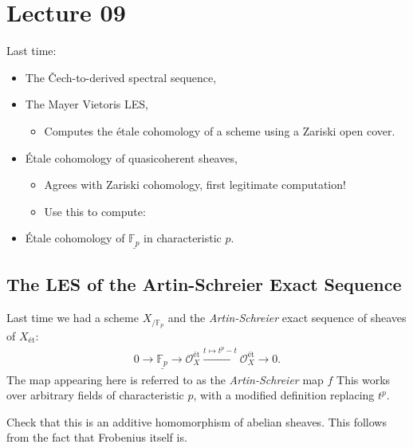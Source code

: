 \hypertarget{lecture-09}{%
\section{Lecture 09}\label{lecture-09}}

Last time:

\begin{itemize}
\tightlist
\item
  The Čech-to-derived spectral sequence,
\item
  The Mayer Vietoris LES,

  \begin{itemize}
  \tightlist
  \item
    Computes the étale cohomology of a scheme using a Zariski open
    cover.
  \end{itemize}
\item
  Étale cohomology of quasicoherent sheaves,

  \begin{itemize}
  \tightlist
  \item
    Agrees with Zariski cohomology, first legitimate computation!
  \item
    Use this to compute:
  \end{itemize}
\item
  Étale cohomology of \(\underline{{\mathbb{F}}_p}\) in characteristic
  \(p\).
\end{itemize}

\hypertarget{the-les-of-the-artin-schreier-exact-sequence}{%
\subsection{The LES of the Artin-Schreier Exact
Sequence}\label{the-les-of-the-artin-schreier-exact-sequence}}

Last time we had a scheme \(X_{/{\mathbb{F}}_p}\) and the
\emph{Artin-Schreier} exact sequence of sheaves of \(X_\text{ét}\):
\begin{align*}  
0\to \underline{{\mathbb{F}}_p} \to {\mathcal{O}}_X^\text{ét}\xrightarrow{t\mapsto t^p - t} {\mathcal{O}}_X^\text{ét}\to 0
.\end{align*}
The map appearing here is referred to as the \emph{Artin-Schreier} map
\(f\) This works over arbitrary fields of characteristic \(p\), with a
modified definition replacing \(t^p\).

\begin{exercise}[?]

Check that this is an additive homomorphism of abelian sheaves. This
follows from the fact that Frobenius itself is.

\end{exercise}

